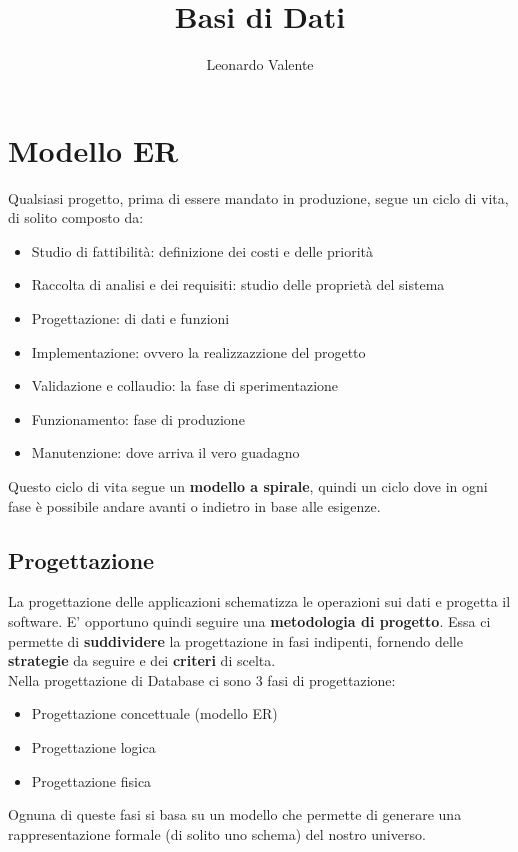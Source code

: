\documentclass[12pt, a4paper]{article}
\author{Leonardo Valente}
\title{Basi di Dati}
\begin{document}
    \maketitle
    \tableofcontents
    \section{Modello ER}
    Qualsiasi progetto, prima di essere mandato in produzione, segue un ciclo di vita, di solito composto da:

    \begin{itemize}
        \item Studio di fattibilità: definizione dei costi e delle priorità
        \item Raccolta di analisi e dei requisiti: studio delle proprietà del sistema
        \item Progettazione: di dati e funzioni
        \item Implementazione: ovvero la realizzazzione del progetto
        \item Validazione e collaudio: la fase di sperimentazione
        \item Funzionamento: fase di produzione
        \item Manutenzione: dove arriva il vero guadagno
    \end{itemize}

    Questo ciclo di vita segue un \textbf{modello a spirale}, quindi un ciclo dove in ogni fase è possibile
    andare avanti o indietro in base alle esigenze.

    \subsection{Progettazione}
    La progettazione delle applicazioni schematizza le operazioni sui dati e progetta il software.
    E' opportuno quindi seguire una \textbf{metodologia di progetto}.
    Essa ci permette di \textbf{suddividere} la progettazione in fasi indipenti,
    fornendo delle \textbf{strategie} da seguire e dei \textbf{criteri} di scelta.
    \\
    Nella progettazione di Database ci sono 3 fasi di progettazione: 
    \begin{itemize}
        \item Progettazione concettuale (modello ER)
        \item Progettazione logica
        \item Progettazione fisica
    \end{itemize}
    Ognuna di queste fasi si basa su un modello che permette di generare una rappresentazione
    formale (di solito uno schema) del nostro universo.
    
\end{document}
